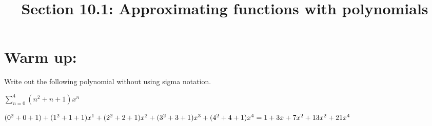 \documentclass[handout]{ximera}
\title{Section 10.1: Approximating functions with polynomials}
\begin{document}
\begin{abstract}		\end{abstract}
\maketitle


\section{Warm up:}

\begin{problem}
Write out the following polynomial without using sigma notation.

$\sum_{n=0}^4 (n^2+n+1)x^n $

\begin{freeResponse}
$(0^2+0+1)+(1^2+1+1)x^1+(2^2+2+1)x^2+(3^2+3+1)x^3+(4^2+4+1)x^4 \\
= 1+3x+7x^2+13x^2+21x^4$
\end{freeResponse}
\end{problem}
\end{document}

